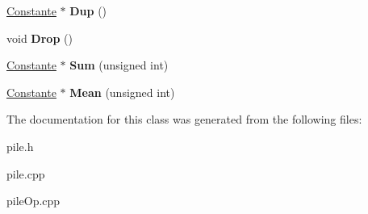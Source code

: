 \begin{DoxyCompactItemize}
\item 
\hypertarget{class_pile_stockage_a651e93d46cf89c8145fd51a664a40dda}{\hyperlink{class_constante}{Constante} $\ast$ {\bfseries Dup} ()}\label{class_pile_stockage_a651e93d46cf89c8145fd51a664a40dda}

\item 
\hypertarget{class_pile_stockage_a26f65a5b14708d44d52167f526cebd67}{void {\bfseries Drop} ()}\label{class_pile_stockage_a26f65a5b14708d44d52167f526cebd67}

\item 
\hypertarget{class_pile_stockage_afa26a3bdd4b29a3559a0710b8ab29eba}{\hyperlink{class_constante}{Constante} $\ast$ {\bfseries Sum} (unsigned int)}\label{class_pile_stockage_afa26a3bdd4b29a3559a0710b8ab29eba}

\item 
\hypertarget{class_pile_stockage_a062111e36b1a30b22ccaa8e5e27d0f61}{\hyperlink{class_constante}{Constante} $\ast$ {\bfseries Mean} (unsigned int)}\label{class_pile_stockage_a062111e36b1a30b22ccaa8e5e27d0f61}

\end{DoxyCompactItemize}


The documentation for this class was generated from the following files\-:\begin{DoxyCompactItemize}
\item 
pile.\-h\item 
pile.\-cpp\item 
pile\-Op.\-cpp\end{DoxyCompactItemize}
